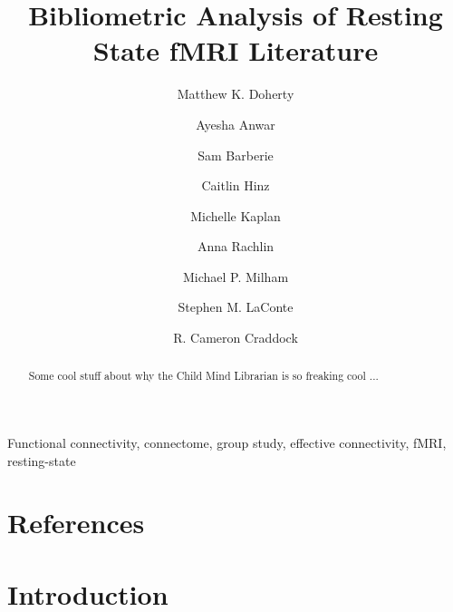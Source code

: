 \documentclass[12pt,3p]{elsarticle}
\begin{document}
\title{Bibliometric Analysis of Resting State fMRI Literature}

\author[cmi]{Matthew K. Doherty}
\author[cmi]{Ayesha Anwar}
\author[cmi]{Sam Barberie}
\author[cmi]{Caitlin Hinz}
\author[cmi]{Michelle Kaplan}
\author[cmi]{Anna Rachlin}
\author[cmi,nki]{Michael P. Milham}
\author[vtcri,vtbme]{Stephen M. LaConte}
\author[cmi,nki]{R. Cameron Craddock}


\address[cmi]{Child Mind Institute, New York, New York}
\address[nki]{Nathan Kline Institute for Psychiatric Research, Orangeburg, New York}
\address[vtcri]{Virginia Tech Carilion Research Institute, Roanoke, Virginia}
\address[vtbme]{School of Biomedical Engineering and Sciences, Virginia Tech,
Blacksburg, Virginia}

\begin{abstract}
    Some cool stuff about why the Child Mind Librarian is so freaking cool ...
\end{abstract}

\begin{keyword}
    Functional connectivity, connectome, group study, effective
    connectivity, fMRI, resting-state
\end{keyword}

\maketitle


\sloppy %
{
\section*{References} \small 
 }


\section{Introduction}
\end{document}
